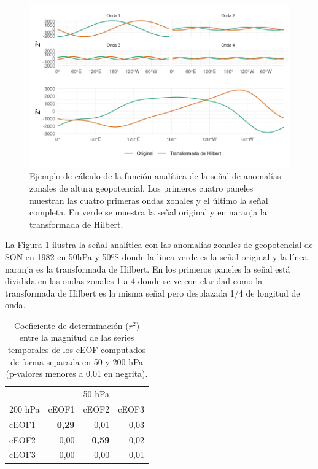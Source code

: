 \documentclass[12pt,oneside,a4paper]{reedthesis}
\begin{document}
\begin{figure}

{\centering \includegraphics{figures/20-ceofs/hilbert-ejemplo-1} 

}

\caption{Ejemplo de cálculo de la función analítica de la señal de anomalías zonales de altura geopotencial. Los primeros cuatro paneles muestran las cuatro primeras ondas zonales y el último la señal completa. En verde se muestra la señal original y en naranja la transformada de Hilbert.}\label{fig:hilbert-ejemplo}
\end{figure}

La Figura \ref{fig:hilbert-ejemplo} ilustra la señal analítica con las anomalías zonales de geopotencial de SON en 1982 en 50hPa y 50ºS donde la línea verde es la señal original y la línea naranja es la transformada de Hilbert.
En los primeros paneles la señal está dividida en las ondas zonales 1 a 4 donde se ve con claridad como la transformada de Hilbert es la misma señal pero desplazada 1/4 de longitud de onda.



\begin{table}

\caption{\label{tab:corr-ceof-splitted}Coeficiente de determinación (\(r^2\)) entre la magnitud de las series temporales de los cEOF computados de forma separada en 50 y 200 hPa (p-valores menores a 0.01 en negrita).}
\centering
\begin{tabular}[t]{l>{}r>{}r>{}r}
\toprule
\multicolumn{1}{c}{} & \multicolumn{3}{c}{50 hPa} \\
\cmidrule(l{3pt}r{3pt}){2-4}
200 hPa & cEOF1 & cEOF2 & cEOF3\\
\midrule
cEOF1 & \textbf{0,29} & 0,01 & 0,03\\
cEOF2 & 0,00 & \textbf{0,59} & 0,02\\
cEOF3 & 0,00 & 0,00 & 0,01\\
\bottomrule
\end{tabular}
\end{table}
\end{document}
